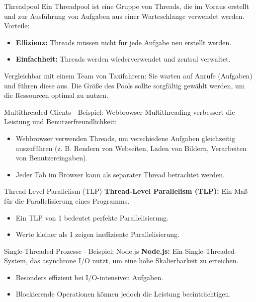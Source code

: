 \documentclass{beamer}
\begin{document}
\begin{frame}{Threadpool}
    Ein Threadpool ist eine Gruppe von Threads, die im Voraus erstellt und zur Ausführung von Aufgaben aus einer Warteschlange verwendet werden. Vorteile:
    \begin{itemize}
        \item \textbf{Effizienz:} Threads müssen nicht für jede Aufgabe neu erstellt werden.
        \item \textbf{Einfachheit:} Threads werden wiederverwendet und zentral verwaltet.
    \end{itemize}
    Vergleichbar mit einem Team von Taxifahrern: Sie warten auf Anrufe (Aufgaben) und führen diese aus. Die Größe des Pools sollte sorgfältig gewählt werden, um die Ressourcen optimal zu nutzen.
\end{frame}

\begin{frame}{Multithreaded Clients - Beispiel: Webbrowser}
    Multithreading verbessert die Leistung und Benutzerfreundlichkeit:
    \begin{itemize}
        \item Webbrowser verwenden Threads, um verschiedene Aufgaben gleichzeitig auszuführen (z. B. Rendern von Webseiten, Laden von Bildern, Verarbeiten von Benutzereingaben).
        \item Jeder Tab im Browser kann als separater Thread betrachtet werden.
    \end{itemize}
\end{frame}

\begin{frame}{Thread-Level Parallelism (TLP)}
    \textbf{Thread-Level Parallelism (TLP):} Ein Maß für die Parallelisierung eines Programms.
    \begin{itemize}
        \item Ein TLP von 1 bedeutet perfekte Parallelisierung.
        \item Werte kleiner als 1 zeigen ineffiziente Parallelisierung.
    \end{itemize}
\end{frame}

\begin{frame}{Single-Threaded Prozesse - Beispiel: Node.js}
    \textbf{Node.js:} Ein Single-Threaded-System, das asynchrone I/O nutzt, um eine hohe Skalierbarkeit zu erreichen.
    \begin{itemize}
        \item Besonders effizient bei I/O-intensiven Aufgaben.
        \item Blockierende Operationen können jedoch die Leistung beeinträchtigen.
    \end{itemize}
\end{frame}
\end{document}
